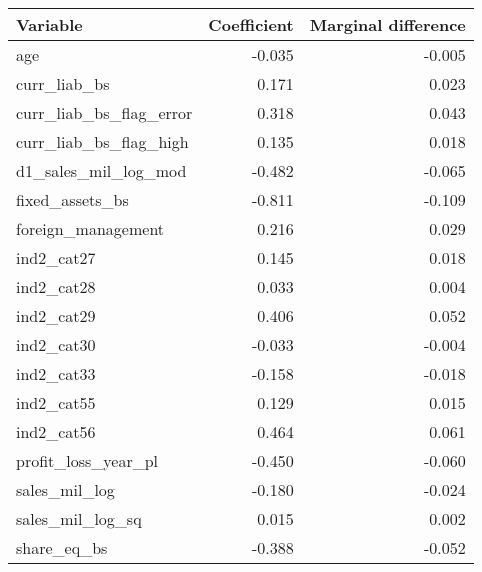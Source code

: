 
\begin{tabular}[t]{lrr}
\hline
Variable & Coefficient & Marginal difference\\
\hline
age & -0.035 & -0.005\\
curr\_liab\_bs & 0.171 & 0.023\\
curr\_liab\_bs\_flag\_error & 0.318 & 0.043\\
curr\_liab\_bs\_flag\_high & 0.135 & 0.018\\
d1\_sales\_mil\_log\_mod & -0.482 & -0.065\\
fixed\_assets\_bs & -0.811 & -0.109\\
foreign\_management & 0.216 & 0.029\\
ind2\_cat27 & 0.145 & 0.018\\
ind2\_cat28 & 0.033 & 0.004\\
ind2\_cat29 & 0.406 & 0.052\\
ind2\_cat30 & -0.033 & -0.004\\
ind2\_cat33 & -0.158 & -0.018\\
ind2\_cat55 & 0.129 & 0.015\\
ind2\_cat56 & 0.464 & 0.061\\
profit\_loss\_year\_pl & -0.450 & -0.060\\
sales\_mil\_log & -0.180 & -0.024\\
sales\_mil\_log\_sq & 0.015 & 0.002\\
share\_eq\_bs & -0.388 & -0.052\\
\hline
\end{tabular}
